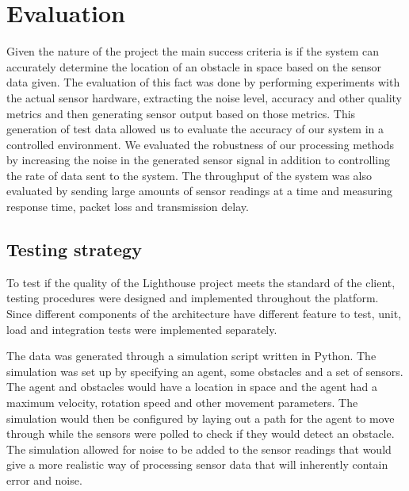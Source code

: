 \documentclass[prodmode,acmtosem]{acmsmall} %
\begin{document}


\section{Evaluation}
Given the nature of the project the main success criteria is if the system can accurately determine the location of an obstacle in space based on the sensor data given. The evaluation of this fact was done by performing experiments with the actual sensor hardware, extracting the noise level, accuracy and other quality metrics and then generating sensor output based on those metrics. This generation of test data allowed us to evaluate the accuracy of our system in a controlled environment. We evaluated the robustness of our processing methods by increasing the noise in the generated sensor signal in addition to controlling the rate of data sent to the system. The throughput of the system was also evaluated by sending large amounts of sensor readings at a time and measuring response time, packet loss and transmission delay.

\subsection{Testing strategy}
To test if the quality of the Lighthouse project meets the standard of the client, testing procedures were designed and implemented throughout the platform. Since different components of the architecture have different feature to test, unit, load and integration tests were implemented separately.

The data was generated through a simulation script written in Python. The simulation was set up by specifying an agent, some obstacles and a set of sensors. The agent and obstacles would have a location in space and the agent had a maximum velocity, rotation speed and other movement parameters. The simulation would then be configured by laying out a path for the agent to move through while the sensors were polled to check if they would detect an obstacle. The simulation allowed for noise to be added to the sensor readings that would give a more realistic way of processing sensor data that will inherently contain error and noise.
\end{document}
